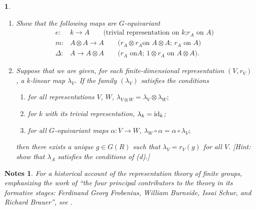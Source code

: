 \documentclass[a4paper,11pt,final]{memoir}%
\newtheorem*{nt}{Notes}
\newtheorem{exercise}[Y]{}
\theoremstyle{nonumberplain}
\begin{document}
\begin{exercise}
\begin{enumerate}
\item Show that the following maps are $G$-equivariant%
\begin{align*}
e\colon &  k\rightarrow A\quad\quad\text{(trivial representation on }k\text{;
}r_{A}\text{ on }A)\\
m\colon &  A\otimes A\rightarrow A\quad\quad\text{(}r_{A}\otimes r_{A}\text{
on }A\otimes A\text{; }r_{A}\text{ on }A)\\
\Delta\colon &  A\rightarrow A\otimes A\quad\quad\text{(}r_{A}\text{ on
}A\text{; }1\otimes r_{A}\text{ on }A\otimes A).
\end{align*}


\item Suppose that we are given, for each finite-dimensional representation
$(V,r_{V})$, a $k$-linear map $\lambda_{V}$. If the family $(\lambda_{V})$
satisfies the conditions

\begin{enumerate}
\item for all representations $V$, $W$, $\lambda_{V\otimes W}=\lambda
_{V}\otimes\lambda_{W};$

\item for $k$ with its trivial representation, $\lambda_{k}=\operatorname{id}_{k}$;

\item for all $G$-equivariant maps $\alpha\colon V\rightarrow W$, $\lambda
_{W}\circ\alpha=\alpha\circ\lambda_{V};$
\end{enumerate}

\noindent then there exists a unique $g\in G(R)$ such that $\lambda_{V}%
=r_{V}(g)$ for all $V$. [Hint: show that $\lambda_{A}$ satisfies the
conditions of (d).]
\end{enumerate}
\end{exercise}

\begin{nt}
For a historical account of the representation theory of finite groups,
emphasizing the work of \textquotedblleft the four principal contributors to
the theory in its formative stages: Ferdinand Georg Frobenius, William
Burnside, Issai Schur, and Richard Brauer\textquotedblright, see
\cite{curtis1999}.
\end{nt}
\end{document}
